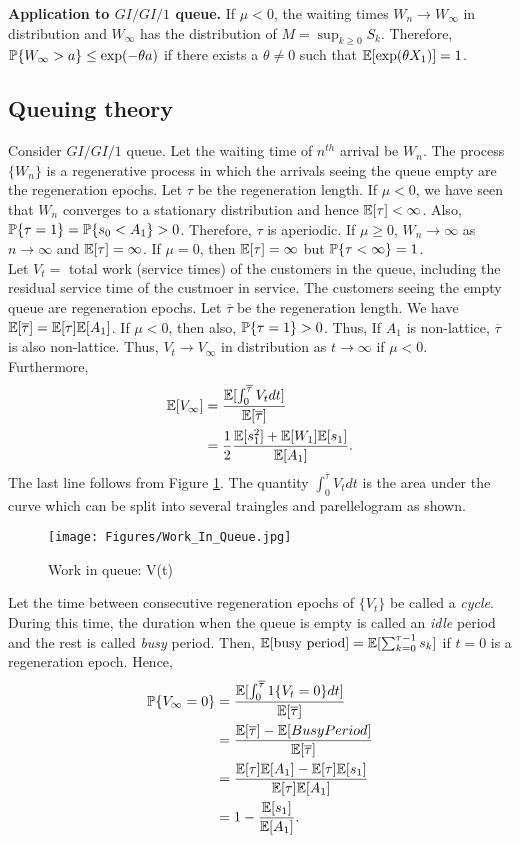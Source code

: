 \documentclass[all-lectures.tex]{subfiles}
\begin{document}
\indent \textbf{Application to $GI/GI/1$ queue.} If $\mu < 0$, the waiting times $W_n \to W_\infty$ in distribution and $W_\infty$ has the distribution of $M = \sup_{k \geq 0}S_k$. Therefore, $\P\{W_\infty > a\} \leq \exp(-\theta a)$ if there exists a $\theta \neq 0$ such that $\E[\exp(\theta X_1)] = 1$.
\subsection{Queuing theory}
Consider $GI/GI/1$ queue. Let the waiting time of $n^{th}$ arrival be $W_n$. The process $\{W_n\}$ is a regenerative process in which the arrivals seeing the queue empty are the regeneration epochs. Let $\tau$ be the regeneration length. If $\mu<0$, we have seen that  $W_n$ converges to a stationary distribution and hence $\E[\tau]<\infty$. Also, $\P\{\tau = 1\} = \P\{s_0 < A_1\} >0$. Therefore, $\tau$ is aperiodic. If $\mu\geq 0$, $W_n \to \infty$ as $n \to \infty$ and $\E[\tau] = \infty$.  If $\mu =0$, then $\E[\tau]= \infty$ but $\P\{\tau < \infty\} =1$.\\
\indent Let $V_t=$ total work (service times) of the customers in the queue, including the residual service time of the custmoer in service. The customers seeing the empty queue are regeneration epochs. Let $\overline{\tau}$ be the regeneration length. We have $\E[\overline{\tau}] = \E[\tau]\E[A_1]$. If $\mu < 0$, then also, $\P\{\tau =1\}>0$. Thus, If $A_1$ is non-lattice, $\overline{\tau}$ is also non-lattice. Thus, $V_t \to V_\infty$ in distribution as $t \to \infty$ if $\mu <0$.\\
\indent Furthermore, %
\begin{align*}
\E[V_\infty] &= \frac{\E[\int_0^{\overline{\tau}} V_t dt]}{\E[\overline{\tau}]} \\
&= \frac{1}{2} \frac{\E[s_1^2] + \E[W_1]\E[s_1]}{\E[A_1]}.
\end{align*}
The last line follows from Figure \ref{fig:work_in_queue}. The quantity $\int_0^{\overline{\tau}} V_t dt$ is the area under the curve which can be split into several traingles and parellelogram as shown. \\
\begin{figure}
\centering
\texttt{[image: Figures/Work\_In\_Queue.jpg]}
\caption{Work in queue: V(t)}
\label{fig:work_in_queue}
\end{figure}
\indent Let the time between consecutive regeneration epochs of $\{V_t\}$ be called a \textit{cycle}. During this time, the duration when the queue is empty is called an \textit{idle }period and the rest is called \textit{busy} period. Then, $\E[\text{busy period}] = \E[\sum_{k=0}^{\tau -1} s_k]$ if $t=0$ is a regeneration epoch. Hence, 
\begin{align*}
\P\{V_\infty = 0\}  &= \frac{ \E[\int_0^{\overline{\tau}} 1\{V_t=0\}dt]}{\E[\overline{\tau}]} \\
&= \frac{\E[\overline{\tau}]-\E[Busy Period]}{\E[\overline{\tau}]} \\
&= \frac{\E[{\tau}]\E[A_1]-\E[\tau]\E[s_1]}{\E[{\tau}]\E[A_1]} \\
&= 1-\frac{\E[s_1]}{\E[A_1]}.
\end{align*}
\end{document}
